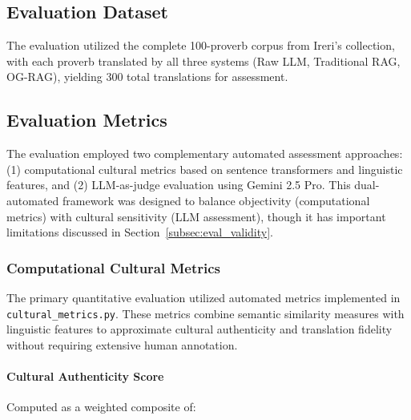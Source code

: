 \subsection{Evaluation Dataset}
\label{subsec:eval_dataset}

The evaluation utilized the complete 100-proverb corpus from Ireri's collection, with each proverb translated by all three systems (Raw LLM, Traditional RAG, OG-RAG), yielding 300 total translations for assessment.

\subsection{Evaluation Metrics}
\label{subsec:eval_metrics}

The evaluation employed two complementary automated assessment approaches: (1) computational cultural metrics based on sentence transformers and linguistic features, and (2) LLM-as-judge evaluation using Gemini 2.5 Pro. This dual-automated framework was designed to balance objectivity (computational metrics) with cultural sensitivity (LLM assessment), though it has important limitations discussed in Section~\ref{subsec:eval_validity}.

\subsubsection{Computational Cultural Metrics}
\label{subsubsec:computational_metrics}

The primary quantitative evaluation utilized automated metrics implemented in \texttt{cultural\_metrics.py}. These metrics combine semantic similarity measures with linguistic features to approximate cultural authenticity and translation fidelity without requiring extensive human annotation.

\paragraph{Cultural Authenticity Score} 
Computed as a weighted composite of:

